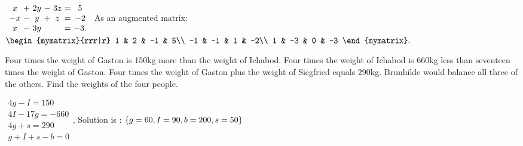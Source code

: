 \begin{enumialphparenastyle}
\begin{ex}
  \begin{sol}
    $
    \begin{array}{c@{~}c@{~}c@{~}c@{~}c@{~}c@{~}c}
      x &+& 2y &-& 3z &=& 5\\
      -x &-& y &+& z &=& -2\\
      x &-& 3y && &=& -3.\\
    \end{array}
    $
    As an augmented matrix:
    $
    \begin{mymatrix}{rrr|r}
      1 & 2 & -1 & 5\\
      -1 & -1 & 1 & -2\\
      1 & -3 & 0 & -3
    \end{mymatrix}.
    $
  \end{sol}
\end{ex}


\begin{ex}
Four times the weight of Gaston is 150kg more than the weight of
Ichabod. Four times the weight of Ichabod is 660kg less than seventeen
times the weight of Gaston. Four times the weight of Gaston plus the weight
of Siegfried equals 290kg. Brunhilde would balance all three of the
others. Find the weights of the four people.
\begin{sol}
$\begin{array}{c}
4g-I=150 \\
4I-17g=-660 \\
4g+s=290 \\
g+I+s-b=0
\end{array}
$, Solution is : $\left\{g=60,I=90,b=200,s=50\right\} $
\end{sol}
\end{ex}

\end{enumialphparenastyle}
